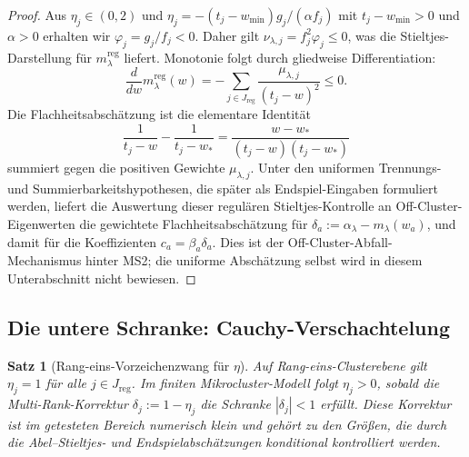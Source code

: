 \documentclass[12pt,a4paper]{article}
\newtheorem{theorem}{Satz}[section]
\theoremstyle{definition}
\theoremstyle{remark}
\newcommand{\reg}{\mathrm{reg}}
\newcommand{\wmin}{w_{\min}}
\begin{document}
\begin{proof}
Aus $\eta_j \in (0,2)$ und
$\eta_j = -(t_j-\wmin)g_j/(\alpha f_j)$ mit $t_j-\wmin>0$ und
$\alpha>0$ erhalten wir $\varphi_j = g_j/f_j < 0$. Daher gilt
$\nu_{\lambda,j} = f_j^2 \varphi_j \le 0$, was die Stieltjes-Darstellung
für $m_\lambda^{\reg}$ liefert. Monotonie folgt durch gliedweise Differentiation:
\[
  \frac{d}{dw} m_\lambda^{\reg}(w)
  =
  -\sum_{j\in J_{\reg}}
  \frac{\mu_{\lambda,j}}{(t_j-w)^2}
  \le 0.
\]
Die Flachheitsabschätzung ist die elementare Identität
\[
  \frac{1}{t_j-w} - \frac{1}{t_j-w_\ast}
  =
  \frac{w-w_\ast}{(t_j-w)(t_j-w_\ast)}
\]
summiert gegen die positiven Gewichte $\mu_{\lambda,j}$. Unter den
uniformen Trennungs- und Summierbarkeitshypothesen, die später als
Endspiel-Eingaben formuliert werden, liefert die Auswertung dieser
regulären Stieltjes-Kontrolle an Off-Cluster-Eigenwerten die gewichtete
Flachheitsabschätzung für $\delta_a := \alpha_\lambda-m_\lambda(w_a)$,
und damit für die Koeffizienten $c_a = \beta_a\delta_a$. Dies ist der
Off-Cluster-Abfall-Mechanismus hinter MS2; die uniforme Abschätzung selbst
wird in diesem Unterabschnitt nicht bewiesen. \qedhere
\end{proof}

\subsection{Die untere Schranke: Cauchy-Verschachtelung}

\begin{theorem}[Rang-eins-Vorzeichenzwang für $\eta$]
\label{thm:eta-positive}
Auf Rang-eins-Clusterebene gilt $\eta_j=1$ für alle
$j\in J_{\reg}$. Im finiten Mikrocluster-Modell folgt $\eta_j>0$,
sobald die Multi-Rank-Korrektur $\delta_j:=1-\eta_j$ die Schranke
$|\delta_j|<1$ erfüllt. Diese Korrektur ist im getesteten Bereich
numerisch klein und gehört zu den Größen, die durch die Abel--Stieltjes-
und Endspielabschätzungen konditional kontrolliert werden.
\end{theorem}
\end{document}
